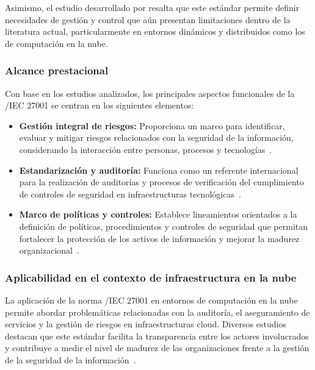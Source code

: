 Asimismo, el estudio desarrollado por \citeauthor{tissir2021cybersecurity} resalta que este estándar permite definir necesidades de 
gestión y control que aún presentan limitaciones dentro de la literatura actual, particularmente en entornos dinámicos y distribuidos 
como los de computación en la nube.

\subsubsection{Alcance prestacional}

Con base en los estudios analizados, los principales aspectos funcionales de la \ISO/IEC 27001 se centran en los siguientes elementos:

\begin{itemize}
	\item \textbf{Gestión integral de riesgos:} Proporciona un marco para identificar, evaluar y mitigar riesgos relacionados con la seguridad de la información, considerando la interacción entre personas, procesos y tecnologías~\cite{tissir2021cybersecurity}.
	
	\item \textbf{Estandarización y auditoría:} Funciona como un referente internacional para la realización de auditorías y procesos de verificación del cumplimiento de controles de seguridad en infraestructuras tecnológicas~\cite{gambo2025navigating}.
	
	\item \textbf{Marco de políticas y controles:} Establece lineamientos orientados a la definición de políticas, procedimientos y controles de seguridad que permitan fortalecer la protección de los activos de información y mejorar la madurez organizacional~\cite{tissir2021cybersecurity}.
\end{itemize}

\subsubsection{Aplicabilidad en el contexto de infraestructura en la nube}

La aplicación de la norma \ISO/IEC 27001 en entornos de computación en la nube permite abordar problemáticas relacionadas con la auditoría, 
el aseguramiento de servicios y la gestión de riesgos en infraestructuras cloud. Diversos estudios destacan que este estándar facilita la 
transparencia entre los actores involucrados y contribuye a medir el nivel de madurez de las organizaciones frente a la gestión de la 
seguridad de la información~\cite{rajesh2024unified,tissir2021cybersecurity}.

